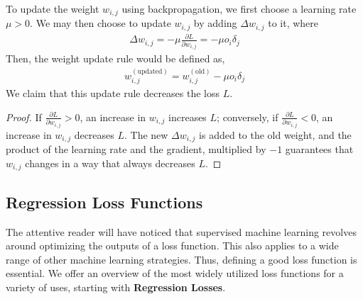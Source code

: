 \documentclass{article}
\begin{document}
  To update the weight $w_{i,j}$ using backpropagation, we first choose a learning rate $\mu> 0$. We may then choose to update $w_{i,j}$ by adding $\Delta w_{i,j}$ to it, where
  \begin{equation*}
    \begin{split}
      \Delta w_{i,j} = -\mu \frac{\partial {L}}{\partial {w_{i,j}}}  = - \mu  o_i \delta_j
    \end{split}
  \end{equation*}
 Then, the weight update rule would be defined as, 
 \begin{equation*}
  \begin{split}
    w_{i,j}^{(\text{updated})} =  w_{i,j}^{(\text{old})} - \mu  o_i \delta_j
  \end{split}
 \end{equation*}
 We claim that this update rule decreases the loss $L$. 
 \begin{proof} 
  
If ${\frac {\partial L}{\partial w_{i,j}}}>0$, an increase in $w_{i,j}$ increases $L$; conversely, if $\frac {\partial L}{\partial w_{i,j}}<0$, an increase in $w_{i,j}$ decreases $L$. The new $\Delta w_{i,j}$ is added to the old weight, and the product of the learning rate and the gradient, multiplied by $-1$ guarantees that $w_{i,j}$  changes in a way that always decreases $L$. 
 \end{proof}

\subsection{Regression Loss Functions}%
  \label{sub:Loss Function}
  The attentive reader will have noticed that supervised machine learning revolves around optimizing the outputs of a loss function. This also applies to a wide range of other machine learning strategies. Thus, defining a good loss function is essential. We offer an overview of the most widely utilized loss functions for a variety of uses, starting with \textbf{Regression Losses}.
\end{document}
